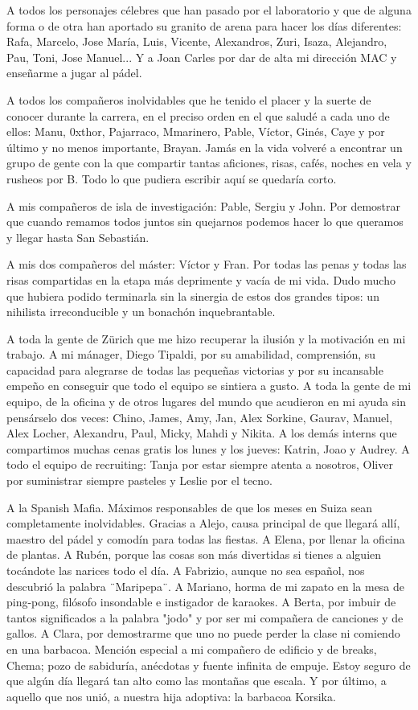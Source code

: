 A todos los personajes célebres que han pasado por el laboratorio y que de alguna forma o de otra han aportado su granito de arena para hacer los días diferentes: Rafa, Marcelo, Jose María, Luis, Vicente, Alexandros, Zuri, Isaza, Alejandro, Pau, Toni, Jose Manuel... Y a Joan Carles por dar de alta mi dirección MAC y enseñarme a jugar al pádel.

A todos los compañeros inolvidables que he tenido el placer y la suerte de conocer durante la carrera, en el preciso orden en el que saludé a cada uno de ellos: Manu, 0xthor, Pajarraco, Mmarinero, Pable, Víctor, Ginés, Caye y por último y no menos importante, Brayan. Jamás en la vida volveré a encontrar un grupo de gente con la que compartir tantas aficiones, risas, cafés, noches en vela y rusheos por B. Todo lo que pudiera escribir aquí se quedaría corto.

A mis compañeros de isla de investigación: Pable, Sergiu y John. Por demostrar que cuando remamos todos juntos sin quejarnos podemos hacer lo que queramos y llegar hasta San Sebastián.

A mis dos compañeros del máster: Víctor y Fran. Por todas las penas y todas las risas compartidas en la etapa más deprimente y vacía de mi vida. Dudo mucho que hubiera podido terminarla sin la sinergia de estos dos grandes tipos: un nihilista irreconducible y un bonachón inquebrantable.

A toda la gente de Zürich que me hizo recuperar la ilusión y la motivación en mi trabajo. A mi mánager, Diego Tipaldi, por su amabilidad, comprensión, su capacidad para alegrarse de todas las pequeñas victorias y por su incansable empeño en conseguir que todo el equipo se sintiera a gusto. A toda la gente de mi equipo, de la oficina y de otros lugares del mundo que acudieron en mi ayuda sin pensárselo dos veces: Chino, James, Amy, Jan, Alex Sorkine, Gaurav, Manuel, Alex Locher, Alexandru, Paul, Micky, Mahdi y Nikita. A los demás interns que compartimos muchas cenas gratis los lunes y los jueves: Katrin, Joao y Audrey. A todo el equipo de recruiting: Tanja por estar siempre atenta a nosotros, Oliver por suministrar siempre pasteles y Leslie por el tecno.

A la Spanish Mafia. Máximos responsables de que los meses en Suiza sean completamente inolvidables. Gracias a Alejo, causa principal de que llegará allí, maestro del pádel y comodín para todas las fiestas. A Elena, por llenar la oficina de plantas. A Rubén, porque las cosas son más divertidas si tienes a alguien tocándote las narices todo el día. A Fabrizio, aunque no sea español, nos descubrió la palabra ¨Maripepa¨. A Mariano, horma de mi zapato en la mesa de ping-pong, filósofo insondable e instigador de karaokes. A Berta, por imbuir de tantos significados a la palabra "jodo" y por ser mi compañera de canciones y de gallos. A Clara, por demostrarme que uno no puede perder la clase ni comiendo en una barbacoa. Mención especial a mi compañero de edificio y de breaks, Chema; pozo de sabiduría, anécdotas y fuente infinita de empuje. Estoy seguro de que algún día llegará tan alto como las montañas que escala. Y por último, a aquello que nos unió, a nuestra hija adoptiva: la barbacoa Korsika.

